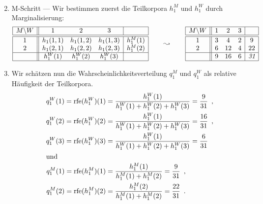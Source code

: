 \documentclass[ngerman, a4paper, 12pt]{article}
\DeclareMathOperator{\rfe}{rfe}
\newcommand{\satzende}{\enskip \text{.}}
\newcommand{\komma}{\enskip \text{,}}
\begin{document}
\begin{enumerate}[label=\textbf{(\alph*)}, leftmargin=0pt]
\begin{align*}
 		\end{align*}
 		\item M-Schritt --- Wir bestimmen zuerst die Teilkorpora $h_1^M$ und $h_1^W$ durch Marginalisierung:
 		\begin{equation*}
 		\begin{array}{|c||ccc|c|}
 		\hline
 		M \backslash W & 1 & 2 & 3 &\\ \hline \hline
 		1 & h_1(1,1) & h_1(1,2) & h_1(1,3) & h_1^M(1) \\
 		2 & h_1(2,1) & h_1(2,2) & h_1(2,3) & h_1^M(2) \\ \hline
 		& h_1^W(1) & h_1^W(2) & h_1^W(3) & \\ \hline
 		\end{array}
 		\qquad \leadsto \qquad 
 		\begin{array}{|c||ccc|c|}
 		\hline
 		M \backslash W & 1 & 2 & 3 &\\ \hline \hline
 		1 & 3 & 4 & 2 & 9 \\
 		2 & 6 & 12 & 4 & 22 \\ \hline
 		  & 9 & 16 & 6 & \textit{31} \\ \hline
 		\end{array}
 		\end{equation*}
 		\item Wir schätzen nun die Wahrscheinlichkeitsverteilung $q_1^M$ und $q_1^W$ als relative Häufigkeit der Teilkorpora.
 		\begin{align*}
 		q_1^W(1) = \rfe(h_1^W)(1) &= \frac{h_1^W(1)}{h_1^W(1) + h_1^W(2) + h_1^W(3)} = \frac{9}{31} \komma \\
 		q_1^W(2) = \rfe(h_1^W)(2) &= \frac{h_1^W(1)}{h_1^W(1) + h_1^W(2) + h_1^W(3)} = \frac{16}{31} \komma \\
 		q_1^W(3) = \rfe(h_1^W)(3) &= \frac{h_1^W(1)}{h_1^W(1) + h_1^W(2) + h_1^W(3)} = \frac{6}{31} \\
 		\intertext{und}
 		q_1^M(1) = \rfe(h_1^M)(1) &= \frac{h_1^M(1)}{h_1^M(1) + h_1^M(2)} = \frac{9}{31} \komma \\
 		q_1^M(2) = \rfe(h_1^M)(2) &= \frac{h_1^M(2)}{h_1^M(1) + h_1^M(2)} = \frac{22}{31} \satzende \\
 		\end{align*}
	\end{enumerate}
\end{document}
